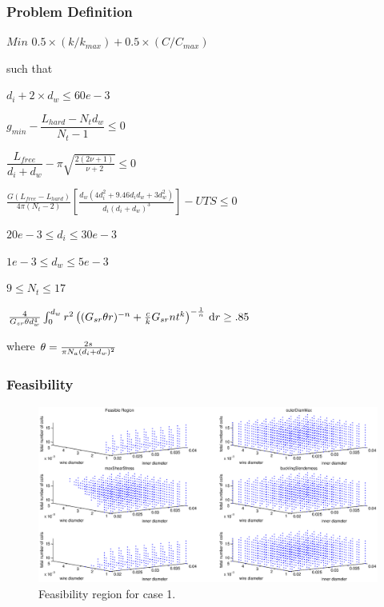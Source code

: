 \documentclass[10pt]{article}
\begin{document}
	\subsubsection{Problem Definition}
	
	\centerline{$Min$ \hspace{2 mm}$0.5 \times(k/k_{max}) + 0.5 \times (C/C_{max})$}
	\begin{center}such that \end{center}
	\centerline{$d_{i} + 2 \times d_{w} \leq 60e-3$}
	\centerline{$g_{min} - \dfrac{L_{hard} - N_{t}d_{w}}{N_{t}-1} \leq 0$}
	\centerline{$\dfrac{L_{free}}{d_{i} + d_{w}} - \pi \sqrt{\frac{2(2 \nu + 1)}{\nu + 2}} \leq 0$}
	\centerline{$\frac{G(L_{free} - L_{hard})}{4 \pi (N_{t} - 2) } \left[\frac{d_{w} (4d_{i}^{2} + 9.46d_{i} 
d_{w} + 3 d_{w}^{2})}{d_{i}(d_{i}+d_{w})^{3}}\right] - UTS \leq 0$}
    \centerline{$20e-3 \leq d_{i} \leq 30e-3$}
    \centerline{$1e-3 \leq d_{w} \leq 5e-3$}
    \centerline{$9 \leq N_{t} \leq 17$}
    
 \centerline{${4\over G_{sr}\theta d_w^4}\int_0^{d_w} r^2 \left( (G_{sr}\theta r)^{-n} + {c\over k} G_{sr}nt^k \right)^{-{1\over n}} \,\mathrm{d} r \ge .85$}
\begin{center} where $\theta = {2s\over \pi N_a (d_i+d_w)^2}$ \end{center}
\newpage
\subsubsection{Feasibility}
	
			\begin{figure}[h!]
		 \begin{center}\includegraphics[scale=.25]{Case_56_3891011_Feasibility.eps}\end{center}
		 \caption{Feasibility region for case 1.}
		 \label{Feasibility region for case 1.}
		 \end{figure}
		 
\end{document}
